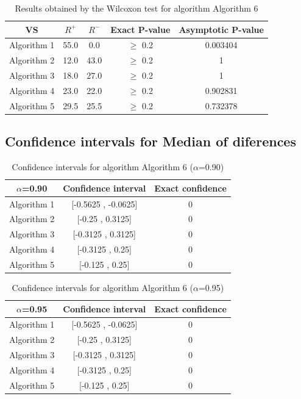 \documentclass[a4paper,10pt]{article}
\begin{document}
\begin{table}[!htp]
\centering\small
\begin{tabular}{
|c|c|c|c|c|}
\hline
 VS & $R^{+}$ & $R^{-}$ & Exact P-value & Asymptotic P-value \\ \hline 
Algorithm 1 & 55.0 & 0.0 & $\geq$ 0.2 & 0.003404\\ \hline 
Algorithm 2 & 12.0 & 43.0 & $\geq$ 0.2 & 1\\ \hline 
Algorithm 3 & 18.0 & 27.0 & $\geq$ 0.2 & 1\\ \hline 
Algorithm 4 & 23.0 & 22.0 & $\geq$ 0.2 & 0.902831\\ \hline 
Algorithm 5 & 29.5 & 25.5 & $\geq$ 0.2 & 0.732378\\ \hline 

\end{tabular}
\caption{Results obtained by the Wilcoxon test for algorithm Algorithm 6}
\end{table}

\subsection{Confidence intervals for Median of diferences}

\begin{table}[!htp]
\centering\small
\begin{tabular}{
|c|c|c|}
\hline
 $\alpha$=0.90 & Confidence interval & Exact confidence \\ \hline 
Algorithm 1 & [-0.5625 , -0.0625] & 0\\ \hline 
Algorithm 2 & [-0.25 , 0.3125] & 0\\ \hline 
Algorithm 3 & [-0.3125 , 0.3125] & 0\\ \hline 
Algorithm 4 & [-0.3125 , 0.25] & 0\\ \hline 
Algorithm 5 & [-0.125 , 0.25] & 0\\ \hline 

\end{tabular}
\caption{Confidence intervals for algorithm Algorithm 6 ($\alpha$=0.90)}
\end{table}
\begin{table}[!htp]
\centering\small
\begin{tabular}{
|c|c|c|}
\hline
 $\alpha$=0.95 & Confidence interval & Exact confidence \\ \hline 
Algorithm 1 & [-0.5625 , -0.0625] & 0\\ \hline 
Algorithm 2 & [-0.25 , 0.3125] & 0\\ \hline 
Algorithm 3 & [-0.3125 , 0.3125] & 0\\ \hline 
Algorithm 4 & [-0.3125 , 0.25] & 0\\ \hline 
Algorithm 5 & [-0.125 , 0.25] & 0\\ \hline 

\end{tabular}
\caption{Confidence intervals for algorithm Algorithm 6 ($\alpha$=0.95)}
\end{table}

 \clearpage 
\end{document}
